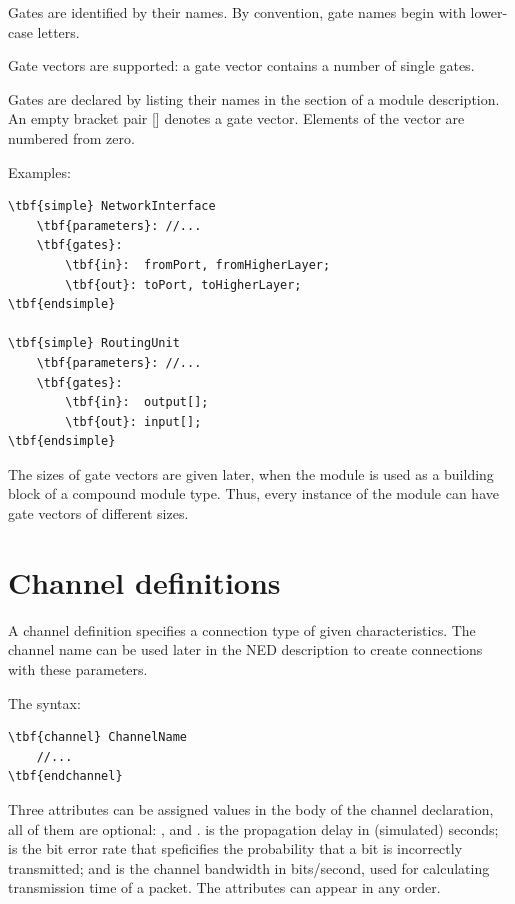 Gates are identified by their names.
By convention, gate names begin with lower-case letters.

Gate vectors are supported: a gate vector
contains a number of single gates.

Gates are declared by listing their names in the
 section of a module description. An
empty bracket pair [] denotes a gate vector.
Elements of the vector are numbered from zero.

Examples:

\begin{Verbatim}[commandchars=\\\{\}]
\tbf{simple} NetworkInterface
    \tbf{parameters}: //...
    \tbf{gates}:
        \tbf{in}:  fromPort, fromHigherLayer;
        \tbf{out}: toPort, toHigherLayer;
\tbf{endsimple}

\tbf{simple} RoutingUnit
    \tbf{parameters}: //...
    \tbf{gates}:
        \tbf{in}:  output[];
        \tbf{out}: input[];
\tbf{endsimple}
\end{Verbatim}

The sizes of gate vectors are given later, when the module is used as
a building block of a compound module type. Thus, every instance of
the module can have gate vectors of different sizes.


\section{Channel definitions}


A channel definition specifies a connection type of given characteristics.
The channel name can be used later in the NED description to
create connections with these parameters.

The syntax:

\begin{Verbatim}[commandchars=\\\{\}]
\tbf{channel} ChannelName
    //...
\tbf{endchannel}
\end{Verbatim}

Three attributes can be assigned values in the body of the channel declaration,
all of them are optional: ,  and .
 is the propagation delay in (simulated) seconds;
 is the bit error rate that speficifies the probability
that a bit is incorrectly transmitted; and 
is the channel bandwidth in bits/second, used for calculating
transmission time of a packet. The attributes can appear
in any order.

